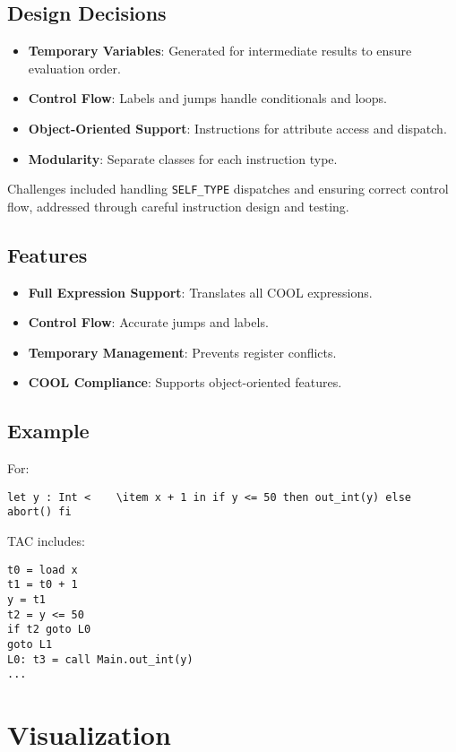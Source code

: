 \documentclass[11pt, titlepage]{article}
\begin{document}
\subsection{Design Decisions}
\begin{itemize}[leftmargin=*]
    \item \textbf{Temporary Variables}: Generated for intermediate results to ensure evaluation order.
    \item \textbf{Control Flow}: Labels and jumps handle conditionals and loops.
    \item \textbf{Object-Oriented Support}: Instructions for attribute access and dispatch.
    \item \textbf{Modularity}: Separate classes for each instruction type.
\end{itemize}    

Challenges included handling \texttt{SELF\_TYPE} dispatches and ensuring correct control flow, addressed through careful instruction design and testing.

\subsection{Features}
\begin{itemize}[leftmargin=*]
    \item \textbf{Full Expression Support}: Translates all COOL expressions.
    \item \textbf{Control Flow}: Accurate jumps and labels.
    \item \textbf{Temporary Management}: Prevents register conflicts.
    \item \textbf{COOL Compliance}: Supports object-oriented features.
\end{itemize}

\subsection{Example}
For:
\begin{lstlisting}
let y : Int <    \item x + 1 in if y <= 50 then out_int(y) else abort() fi
\end{lstlisting}
TAC includes:
\begin{lstlisting}
t0 = load x
t1 = t0 + 1
y = t1
t2 = y <= 50
if t2 goto L0
goto L1
L0: t3 = call Main.out_int(y)
...
\end{lstlisting}

\section{Visualization}
\label{sec:visualization}
\end{document}
